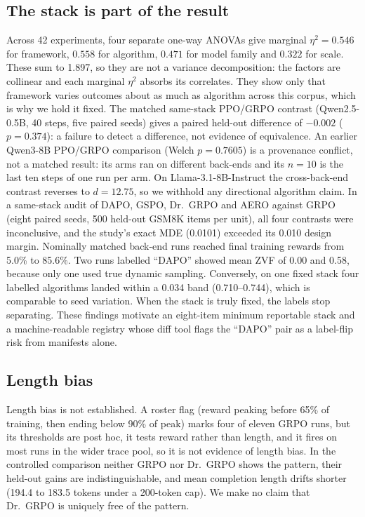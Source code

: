 \documentclass[conference]{IEEEtran}
\begin{document}
\subsection{The stack is part of the result}
Across 42 experiments, four separate one-way ANOVAs give marginal
$\eta^2 = 0.546$ for framework, $0.558$ for algorithm, $0.471$ for model
family and $0.322$ for scale. These sum to 1.897, so they are not a variance
decomposition: the factors are collinear and each marginal $\eta^2$ absorbs
its correlates. They show only that framework varies outcomes about as much
as algorithm across this corpus, which is why we hold it fixed. The matched
same-stack PPO/GRPO contrast (Qwen2.5-0.5B, 40 steps, five paired seeds)
gives a paired held-out difference of $-0.002$ ($p = 0.374$): a failure to
detect a difference, not evidence of equivalence. An earlier Qwen3-8B
PPO/GRPO comparison (Welch $p = 0.7605$) is a provenance conflict, not a
matched result: its arms ran on different back-ends and its $n = 10$ is the
last ten steps of one run per arm. On Llama-3.1-8B-Instruct the cross-back-end
contrast reverses to $d = 12.75$, so we withhold any directional algorithm
claim. In a same-stack
audit of DAPO, GSPO, Dr.\ GRPO and AERO against GRPO (eight paired seeds, 500
held-out GSM8K items per unit), all four contrasts were inconclusive, and the
study's exact MDE (0.0101) exceeded its 0.010 design margin. Nominally matched
back-end runs reached final training rewards from 5.0\% to 85.6\%. Two runs
labelled ``DAPO'' showed mean ZVF of 0.00 and 0.58, because only one used
true dynamic sampling. Conversely, on one fixed stack four labelled
algorithms landed within a 0.034 band (0.710--0.744), which is comparable to
seed variation. When the stack is truly fixed, the labels stop separating.
These findings motivate an eight-item minimum reportable stack and a
machine-readable registry whose diff tool flags the ``DAPO'' pair as a
label-flip risk from manifests alone.

\subsection{Length bias}
Length bias is not established. A roster flag (reward peaking before 65\% of
training, then ending below 90\% of peak) marks four of eleven GRPO runs, but
its thresholds are post hoc, it tests reward rather than length, and it fires
on most runs in the wider trace pool, so it is not evidence of length bias.
In the controlled comparison neither GRPO nor Dr.\ GRPO shows the pattern,
their held-out gains are indistinguishable, and mean completion length drifts
shorter (194.4 to 183.5 tokens under a 200-token cap). We make no claim that
Dr.\ GRPO is uniquely free of the pattern.
\end{document}

